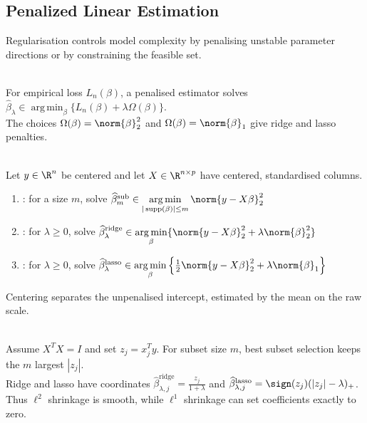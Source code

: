\subsection{Penalized Linear Estimation}
Regularisation controls model complexity by penalising unstable parameter directions or by constraining the feasible set.

\begin{definition} \label{def:sl-penalized-linear-estimator} \\
For empirical loss $L_n(\beta)$, a penalised estimator solves $\widehat{\beta}_{\lambda}\in \operatorname*{arg\,min}_{\beta} \{L_n(\beta)+\lambda\Omega(\beta)\}$.\\
The choices $\Omega(\beta)=\norm{\beta}_2^2$ and $\Omega(\beta)=\norm{\beta}_1$ give ridge and lasso penalties.
\end{definition}

\begin{definition} \label{def:sl-subset-ridge-lasso-linear-models} \\
Let $y\in\R^n$ be centered and let $X\in\R^{n\times p}$ have centered, standardised columns.
\begin{enumerate}[label=(\roman*)]
\setlength{\itemsep}{0pt}
\item {}: for a size $m$, solve $\widehat{\beta}^{\mathrm{sub}}_m\in \operatorname*{arg\,min}\limits_{|\operatorname{supp}(\beta)|\leq m}\norm{y-X\beta}_2^2$
\item {}: for $\lambda\geq0$, solve $\widehat{\beta}^{\mathrm{ridge}}_\lambda\in \operatorname*{arg\,min}\limits_{\beta} \{\norm{y-X\beta}_2^2+\lambda\norm{\beta}_2^2\}$
\item {}: for $\lambda\geq0$, solve $\widehat{\beta}^{\mathrm{lasso}}_\lambda\in \operatorname*{arg\,min}\limits_{\beta} \left\{\frac12\norm{y-X\beta}_2^2+\lambda\norm{\beta}_1\right\}$
\end{enumerate}
Centering separates the unpenalised intercept, estimated by the mean on the raw scale.
\end{definition}

\begin{remark} \label{rem:sl-ridge-lasso-geometry} \\
Assume $X^TX=I$ and set $z_j=x_j^Ty$. For subset size $m$, best subset selection keeps the $m$ largest $|z_j|$.\\
Ridge and lasso have coordinates $\widehat{\beta}^{\mathrm{ridge}}_{\lambda,j}=\frac{z_j}{1+\lambda}$ and $\widehat{\beta}^{\mathrm{lasso}}_{\lambda,j}=\sign(z_j)(|z_j|-\lambda)_+$.\\
Thus $\ell^2$ shrinkage is smooth, while $\ell^1$ shrinkage can set coefficients exactly to zero.
\end{remark}

